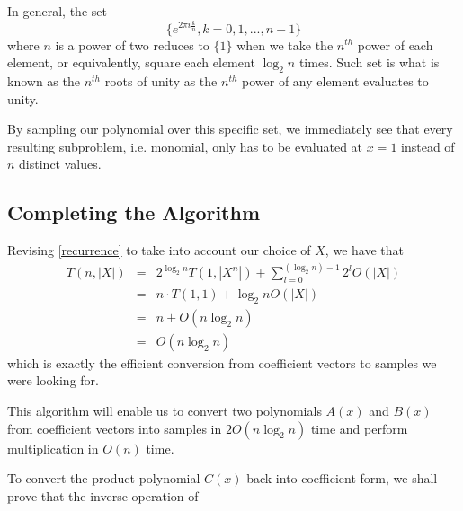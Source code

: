 \documentclass[../article.tex]{subfiles}
\begin{document}
In general, the set
\begin{equation*}
\{e^{2\pi i\frac{k}{n}}, k = 0,1,...,n-1\}
\end{equation*}
where $n$ is a power of two reduces to $\{1\}$ when we take the $n^{th}$ power of each element, or equivalently, square each element $\log_2{n}$ times. Such set is what is known as the $n^{th}$ roots of unity as the $n^{th}$ power of any element evaluates to unity.

By sampling our polynomial over this specific set, we immediately see that every resulting subproblem, i.e. monomial, only has to be evaluated at $x=1$ instead of $n$ distinct values.

\subsection{Completing the Algorithm}

Revising \eqref{recurrence} to take into account our choice of $X$, we have that
\begin{eqnarray*}
T(n, |X|) &=& 2^{\log_2{n}}T(1,|X^n|)+\sum_{l=0}^{(\log_2{n})-1}2^lO(|X|)\\
&=& n\cdot T(1,1) + \log_2{n}O(|X|)\\
&=& n+O(n\log_2{n})\\
&=& O(n\log_2{n})
\end{eqnarray*}
which is exactly the efficient conversion from coefficient vectors to samples we were looking for.

This algorithm will enable us to convert two polynomials $A(x)$ and $B(x)$ from coefficient vectors into samples in $2O(n\log_2{n})$ time and perform multiplication in $O(n)$ time.

To convert the product polynomial $C(x)$ back into coefficient form, we shall prove that the inverse operation of
\end{document}
